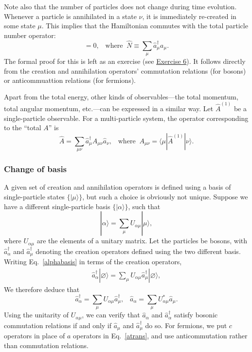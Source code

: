 \documentclass[pra,12pt]{revtex4}
\begin{document}
Note also that the number of particles does not change during time
evolution.  Whenever a particle is annihilated in a state $\nu$, it is
immediately re-created in some state $\mu$.  This implies that the
Hamiltonian commutes with the total particle number operator:
\begin{equation}
  [\hat{H}, \hat{N}] = 0, \;\;\;\mathrm{where}\;\;\hat{N} \equiv \sum_\mu \hat{a}_\mu^\dagger a_\mu.
  \label{Hdiag}
\end{equation}
The formal proof for this is left as an exercise (see
\hyperref[ex:n_conserved]{Exercise 6}).  It follows directly from the
creation and annihilation operators' commutation relations (for
bosons) or anticommuattion relations (for fermions).

Apart from the total energy, other kinds of observables---the total
momentum, total angular momentum, etc.---can be expressed in a similar
way.  Let $\hat{A}^{(1)}$ be a single-particle observable.  For a
multi-particle system, the operator corresponding to the ``total $A$''
is
\begin{equation}
  \hat{A} = \sum_{\mu\nu} \hat{a}^\dagger_\mu A_{\mu\nu} \hat{a}_\nu, \;\;\; \mathrm{where}\;\; A_{\mu\nu} = \langle\mu|\hat{A}^{(1)}|\nu\rangle.
\end{equation}

\subsubsection{Change of basis}

A given set of creation and annihilation operators is defined using a
basis of single-particle states $\{|\mu\rangle\}$, but such a choice
is obviously not unique.  Suppose we have a different single-particle
basis $\{|\alpha\rangle\}$, such that
\begin{equation}
  |\alpha\rangle = \sum_\mu U_{\alpha\mu} |\mu\rangle,
  \label{alphabasis}
\end{equation}
where $U_{\alpha\mu}$ are the elements of a unitary matrix.  Let the
particles be bosons, with $\hat{a}_\alpha^\dagger$ and
$\hat{a}_\mu^\dagger$ denoting the creation operators defined using
the two different basis.  Writing Eq.~\eqref{alphabasis} in terms of
the creation operators,
\begin{align}
  \hat{a}_\alpha^\dagger|\varnothing\rangle
  = \sum_\mu U_{\alpha\mu} \hat{a}_\mu^\dagger |\varnothing\rangle,
\end{align}
We therefore deduce that
\begin{equation}
  \hat{a}_\alpha^\dagger = \sum_\mu U_{\alpha\mu} \hat{a}_\mu^\dagger,
  \;\;\;
  \hat{a}_\alpha = \sum_\mu U_{\alpha\mu}^* \hat{a}_\mu.
  \label{atrans}
\end{equation}
Using the unitarity of $U_{\alpha\mu}$, we can verify that
$\hat{a}_\alpha$ and $\hat{a}_\alpha^\dagger$ satisfy bosonic
commutation relations if and only if $\hat{a}_\mu$ and
$\hat{a}_\mu^\dagger$ do so.  For fermions, we put $c$ operators in
place of $a$ operators in Eq.~\eqref{atrans}, and use anticommutation
rather than commutation relations.
\end{document}
